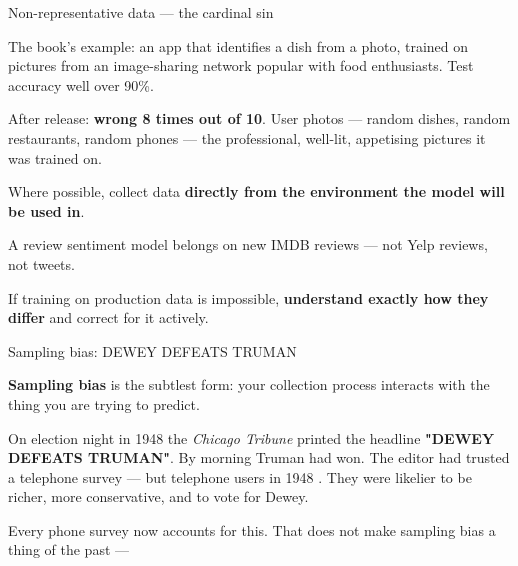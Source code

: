 \documentclass[aspectratio=169,11pt,t]{beamer}
\begin{document}
\begin{frame}[shrink=25]{Non-representative data --- the cardinal sin}
{\fontsize{9.4}{12.6}\selectfont\color{fg2}The book's example: an app that identifies a dish from a photo, trained on pictures from an image-sharing network popular with food enthusiasts. Test accuracy well over 90\%.\par}\vskip 4pt
\begin{iband}[rose]
After release: \textbf{wrong 8 times out of 10}. User photos --- random dishes, random restaurants, random phones ---  the professional, well-lit, appetising pictures it was trained on.
\end{iband}
\begin{ibullets}
\item Where possible, collect data \textbf{directly from the environment the model will be used in}.
\item A review sentiment model belongs on new IMDB reviews --- not Yelp reviews, not tweets.
\item If training on production data is impossible, \textbf{understand exactly how they differ} and correct for it actively.
\end{ibullets}
\end{frame}

\begin{frame}[shrink=25]{Sampling bias: DEWEY DEFEATS TRUMAN}
{\fontsize{9.4}{12.6}\selectfont\color{fg2}\textbf{Sampling bias} is the subtlest form: your collection process interacts with the thing you are trying to predict.\par}\vskip 4pt
{\fontsize{9.4}{12.6}\selectfont\color{fg2}On election night in 1948 the \textit{Chicago Tribune} printed the headline \textbf{"DEWEY DEFEATS TRUMAN"}. By morning Truman had won. The editor had trusted a telephone survey --- but telephone users in 1948 . They were likelier to be richer, more conservative, and to vote for Dewey.\par}\vskip 4pt
\begin{iband}[amber]
Every phone survey now accounts for this. That does not make sampling bias a thing of the past --- 
\end{iband}
\end{frame}
\end{document}
